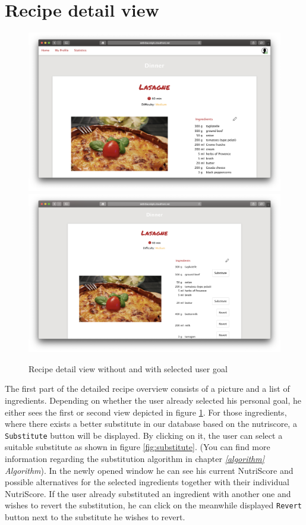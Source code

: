 \section*{Recipe detail view}
\vspace{-1em}
\begin{figure}[H]
	\captionsetup{justification=centering}
	\centering
		\includegraphics[scale=0.25]{Ressourcen/img/screenshots/screenshotH.png}
		\includegraphics[scale=0.25]{Ressourcen/img/screenshots/screenshotI.png}
		\vspace{-1em}
		\caption{Recipe detail view without and with selected user goal}
		\label{fig:recipeDetail}
\end{figure}
\vspace{-2em}
The first part of the detailed recipe overview consists of a picture and a list of ingredients. Depending on whether the user already selected his personal goal, he either sees the first or second view depicted in figure \ref{fig:recipeDetail}. For those ingredients, where there exists a better substitute in our database based on the nutriscore, a \texttt{Substitute} button will be displayed. By clicking on it, the user can select a suitable substitute as shown in figure \ref{fig:substitute}. (You can find more information regarding the substitution algorithm in chapter \emph{\ref{algorithm}  Algorithm}). In the newly opened window he can see his current NutriScore and possible alternatives for the selected ingredients together with their individual NutriScore. If the user already substituted an ingredient with another one and wishes to revert the substitution, he can click on the meanwhile displayed \texttt{Revert} button next to the substitute he wishes to revert. 
